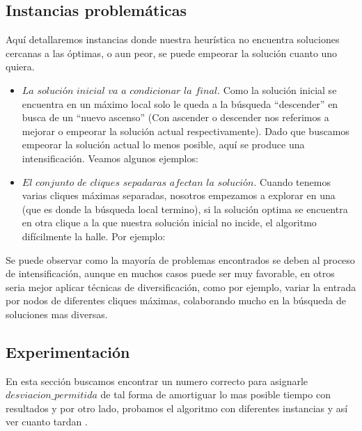 \subsection{Instancias problemáticas}

 Aquí detallaremos instancias donde nuestra heurística no encuentra soluciones cercanas a las óptimas, o aun peor, se puede empeorar la solución cuanto uno quiera.

\begin{itemize}
 
  \item $La$ $solución$ $inicial$ $va$ $a$ $condicionar$ $la$ $final$. Como la solución inicial se encuentra en un máximo local solo le queda a la búsqueda ``descender'' en busca de un ``nuevo ascenso'' (Con ascender o descender nos referimos a mejorar o empeorar la solución actual respectivamente). Dado que buscamos empeorar la solución actual lo menos posible, aquí se produce una intensificación. Veamos algunos ejemplos:
  \item $El$ $conjunto$ $de$ $cliques$ $sepadaras$ $afectan$ $la$ $solución$. Cuando tenemos varias cliques máximas separadas, nosotros empezamos a explorar en una (que es donde la búsqueda local termino), si la solución optima se encuentra en otra clique a la que nuestra solución inicial no incide, el algoritmo difícilmente la halle. Por ejemplo:

\end{itemize}

Se puede observar como la mayoría de problemas encontrados se deben al proceso de intensificación, aunque en muchos casos puede ser muy favorable, en otros seria mejor aplicar técnicas de diversificación, como por ejemplo, variar la entrada por nodos de diferentes cliques máximas, colaborando mucho en la búsqueda de soluciones mas diversas.

\subsection{Experimentación}

 En esta sección buscamos encontrar un numero correcto para asignarle $desviacion\_permitida$ de tal forma de amortiguar lo mas posible tiempo con resultados y por otro lado, probamos el algoritmo con diferentes instancias y así ver cuanto tardan .
